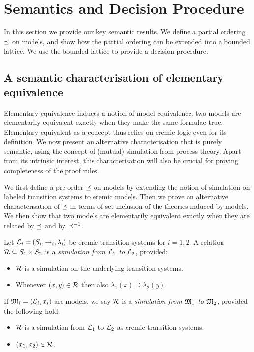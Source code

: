 \section{Semantics and Decision Procedure}
\label{coreEL}

In this section we provide our key semantic results. 
We define a partial ordering $\preceq$ on models, and show how the partial ordering can be extended into a bounded lattice.
We use the bounded lattice to provide a decision procedure.

\subsection{A semantic characterisation of elementary equivalence}\label{elementaryEquivalence}

Elementary equivalence induces a notion of model equivalence: two
models are elementarily equivalent exactly when they make the same
formulae true. Elementary equivalent as a concept thus relies on
eremic logic even for its definition. We now present an alternative
characterisation that is purely semantic, using the concept of
(mutual) simulation from process theory. Apart from its intrinsic
interest, this characterisation will also be crucial for proving
completeness of the proof rules.

We first define a pre-order $\preceq$ on models by extending the
notion of simulation on labeled transition systems to eremic
models. Then we prove an alternative characterisation of $\preceq$
in terms of set-inclusion of the theories induced by models. We then
show that two models are elementarily equivalent exactly when they are
related by $\preceq$ and by $\preceq^{-1}$.

\begin{definition}
Let $\mathcal{L}_i = (S_i, \rightarrow_i, \lambda_i)$ be eremic transition
systems for $i = 1, 2$.  A relation $\mathcal{R} \subseteq S_1 \times S_2$ is
a \emph{simulation from $\mathcal{L}_1$ to $\mathcal{L}_2$}, provided:
\begin{itemize} 

\item $\mathcal{R}$ is a simulation on the underlying transition systems. 

\item Whenever $(x, y) \in \mathcal{R}$ then also $\lambda_1(x) \supseteq
  \lambda_2(y)$.

\end{itemize}

\NI If $\frak{M}_i = (\mathcal{L}_i, x_i)$ are models, we say $\mathcal{R}$ is a
\emph{simulation from $\frak{M}_1$ to $\frak{M}_2$}, provided the following hold.

\begin{itemize}

\item $\mathcal{R}$ is a simulation from $\mathcal{L}_1$ to $\mathcal{L}_2$ as eremic transition systems.

\item  $(x_1, x_2) \in \mathcal{R}$. 

\end{itemize}

\end{definition}

